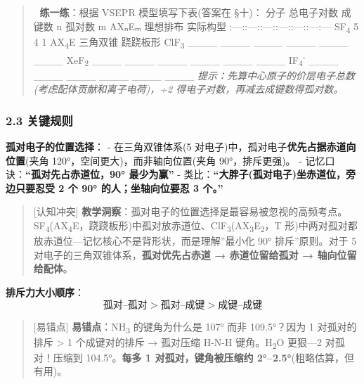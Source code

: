 \begin{quote}
📝 \textbf{练一练}：根据 VSEPR 模型填写下表(答案在 §十)：
\textbar{} 分子 \textbar{} 总电子对数 \textbar{} 成键数 n \textbar{} 孤对数 m \textbar{} AXₙEₘ \textbar{} 理想排布 \textbar{} 实际构型 \textbar{}
\textbar:---:\textbar:---:\textbar:---:\textbar:---:\textbar:---:\textbar:---\textbar:---\textbar{}
\textbar{} SF\textsubscript{4} \textbar{} 5 \textbar{} 4 \textbar{} 1 \textbar{} AX\textsubscript{4}E \textbar{} 三角双锥 \textbar{} 跷跷板形 \textbar{}
\textbar{} ClF\textsubscript{3} \textbar{} \_\_\_\_ \textbar{} \_\_\_\_ \textbar{} \_\_\_\_ \textbar{} \_\_\_\_ \textbar{} \_\_\_\_ \textbar{} \_\_\_\_ \textbar{}
\textbar{} XeF\textsubscript{2} \textbar{} \_\_\_\_ \textbar{} \_\_\_\_ \textbar{} \_\_\_\_ \textbar{} \_\_\_\_ \textbar{} \_\_\_\_ \textbar{} \_\_\_\_ \textbar{}
\textbar{} IF\textsubscript{4}\textsuperscript{-} \textbar{} \_\_\_\_ \textbar{} \_\_\_\_ \textbar{} \_\_\_\_ \textbar{} \_\_\_\_ \textbar{} \_\_\_\_ \textbar{} \_\_\_\_ \textbar{}
\emph{提示：先算中心原子的价层电子总数(考虑配体贡献和离子电荷)，÷2 得电子对数，再减去成键数得孤对数。}
\end{quote}

\subsubsection{2.3 关键规则}\label{ux5173ux952eux89c4ux5219}

\textbf{孤对电子的位置选择}：
- 在三角双锥体系(5 对电子)中，孤对电子\textbf{优先占据赤道向位置}(夹角 120°，空间更大)，而非轴向位置(夹角 90°，排斥更强)。
- 记忆口诀：\textbf{``孤对先占赤道位，90° 最少为赢''}
- 类比：\textbf{``大胖子(孤对电子)坐赤道位，旁边只要忍受 2 个 90° 的人；坐轴向位要忍 3 个。''}

\begin{quote}
{[}认知冲突{]} \textbf{教学洞察}：孤对电子的位置选择是最容易被忽视的高频考点。SF\textsubscript{4}(AX\textsubscript{4}E，跷跷板形)中孤对放赤道位、ClF\textsubscript{3}(AX\textsubscript{3}E\textsubscript{2}，T 形)中两对孤对都放赤道位---记忆核心不是背形状，而是理解''最小化 90° 排斥''原则。对于 5 对电子的三角双锥体系，\textbf{孤对优先占赤道 → 赤道位留给孤对 → 轴向位留给配体}。
\end{quote}

\textbf{排斥力大小顺序}：
\[
\text{孤对–孤对} > \text{孤对–成键} > \text{成键–成键}
\]

\begin{quote}
{[}易错点{]} \textbf{易错点}：NH\textsubscript{3} 的键角为什么是 107° 而非 109.5°？因为 1 对孤对的排斥 \textgreater{} 1 个成键对的排斥 → 孤对压缩 H-N-H 键角。H\textsubscript{2}O 更狠---2 对孤对！压缩到 104.5°。\textbf{每多 1 对孤对，键角被压缩约 2°--2.5°}(粗略估算，但有用)。
\end{quote}

